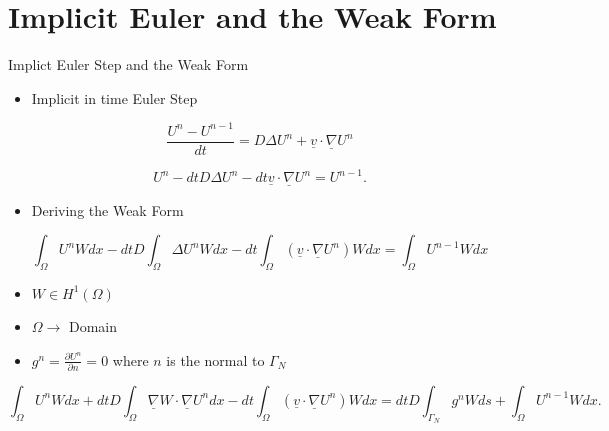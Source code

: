 \documentclass[10pt]{beamer}
\begin{document}
\section{Implicit Euler and the Weak Form}

\begin{frame}{Implict Euler Step and the Weak Form}

\begin{itemize}
\item Implicit in time Euler Step
\end{itemize}
\footnotesize
\begin{equation}
\frac{U^{n}-U^{n-1}}{dt}=D\Delta U^{n}+\underline{v} \cdot \underline{\nabla}U^{n}
\end{equation}

\begin{equation}
U^{n}-dtD\Delta U^{n}-dt\underline{v}\cdot \underline{\nabla}U^{n}=U^{n-1}.
\end{equation}
\normalsize
\begin{itemize}
\item Deriving the Weak Form
\end{itemize}
\footnotesize
\begin{equation}
\int_{\Omega}U^{n}W dx -dtD \int_{\Omega}\Delta U^{n}W dx-dt\int_{\Omega}\left(\underline{v}\cdot \underline{\nabla}U^{n}\right)W dx=\int_{\Omega} U^{n-1}W dx
\end{equation}

\begin{itemize}
\item $W \in H^{1}\left({\Omega}\right)$
\item $\Omega \rightarrow$ Domain
\item $g^{n}=\frac{\partial U^{n}}{\partial n}=0$ where $n$ is the normal to $\Gamma_{N}$
\end{itemize}

\begin{equation}
\int_{\Omega}U^{n}W dx +dtD\int_{\Omega}\underline{\nabla}W \cdot \underline{\nabla} U^{n} dx-dt\int_{\Omega}\left(\underline{v}\cdot \underline{\nabla}U^{n}\right)W dx=dtD\int_{\Gamma_{N}}g^{n}W ds+ \int_{\Omega} U^{n-1}W dx.
\end{equation}
\end{frame}
\normalsize
\end{document}
